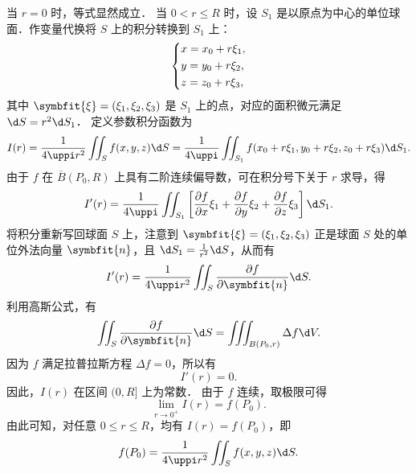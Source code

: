 \begin{myproof}
    当 $r = 0$ 时，等式显然成立．
    当 $0 < r \le R$ 时，设 $S_1$ 是以原点为中心的单位球面．作变量代换将 $S$ 上的积分转换到 $S_1$ 上：
    \begin{equation}
        \label{eq:param-3d}
        \begin{dcases}
            x = x_0 + r \xi_1, \\
            y = y_0 + r \xi_2, \\
            z = z_0 + r \xi_3,
        \end{dcases}
    \end{equation}
    其中 $\symbfit{\xi} = (\xi_1, \xi_2, \xi_3)$ 是 $S_1$ 上的点，对应的面积微元满足 $\d S = r^2 \d S_1$．
    定义参数积分函数为
    \begin{equation}
        \label{eq:def-I-3d}
        I(r) = \frac{1}{4 \uppi r^2} \iint_{S} f(x, y, z) \d S = \frac{1}{4 \uppi} \iint_{S_1} f(x_0 + r \xi_1, y_0 + r \xi_2, z_0 + r \xi_3) \d S_1.
    \end{equation}
    由于 $f$ 在 $\overline{B}(P_0, R)$ 上具有二阶连续偏导数，可在积分号下关于 $r$ 求导，得
    \begin{equation}
        \label{eq:deriv-I-3d}
        I'(r) = \frac{1}{4 \uppi} \iint_{S_1} \left[ \frac{\partial f}{\partial x} \xi_1 + \frac{\partial f}{\partial y} \xi_2 + \frac{\partial f}{\partial z} \xi_3 \right] \d S_1.
    \end{equation}
    将积分重新写回球面 $S$ 上，注意到 $\symbfit{\xi} = (\xi_1, \xi_2, \xi_3)$ 正是球面 $S$ 处的单位外法向量 $\symbfit{n}$，且 $\d S_1 = \frac{1}{r^2} \d S$，从而有
    \begin{equation}
        \label{eq:deriv-I-3d-back}
        I'(r) = \frac{1}{4 \uppi r^2} \iint_{S} \frac{\partial f}{\partial \symbfit{n}} \d S.
    \end{equation}
    利用高斯公式，有
    \begin{equation}
        \label{eq:gauss-3d}
        \iint_{S} \frac{\partial f}{\partial \symbfit{n}} \d S = \iiint_{B(P_0, r)} \Delta f \d V.
    \end{equation}
    因为 $f$ 满足拉普拉斯方程 $\Delta f = 0$，所以有
    \begin{equation}
        \label{eq:zero-deriv-3d}
        I'(r) = 0.
    \end{equation}
    因此，$I(r)$ 在区间 $(0, R]$ 上为常数．
    由于 $f$ 连续，取极限可得
    \begin{equation}
        \lim_{r \to 0^+} I(r) = f(P_0).
    \end{equation}
    由此可知，对任意 $0 \le r \le R$，均有 $I(r) = f(P_0)$，即
    \begin{equation}
        f(P_0) = \frac{1}{4 \uppi r^2} \iint_{S} f(x, y, z) \d S.
    \end{equation}
\end{myproof}

\endinput

